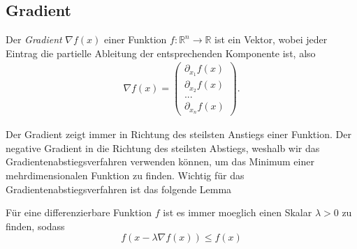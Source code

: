 \subsection{Gradient}
\begin{Def}
Der \emph{Gradient} $\nabla f(x)$ einer Funktion $f:\mathbb{R}^n\rightarrow \mathbb{R}$ ist ein Vektor, wobei jeder Eintrag die partielle Ableitung der entsprechenden Komponente ist, also
\begin{equation*} \begin{split} \nabla f(x) = \left( \begin{array}{c}
\partial_{x_1} f(x) \\
\partial_{x_2} f(x) \\
... \\
\partial_{x_n} f(x)
\end{array}
\right).
\end{split} \end{equation*} 
\end{Def}
Der Gradient zeigt immer in Richtung des steilsten Anstiegs einer Funktion. Der negative Gradient in die Richtung des steilsten Abstiegs, weshalb wir das Gradientenabstiegsverfahren verwenden können, um das Minimum einer mehrdimensionalen Funktion zu finden. Wichtig für das Gradientenabstiegsverfahren ist das folgende Lemma

\begin{Lem}
\label{lem:gradientabstieg}
F\"ur eine differenzierbare Funktion $f$ ist es immer moeglich einen Skalar $\lambda>0$ zu finden, sodass
\begin{equation}
\label{lambda-ungleichung}
f(x - \lambda \nabla f(x)) \leq f(x)
\end{equation} 
\end{Lem}


